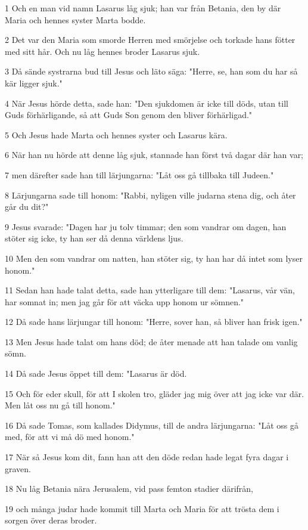 \par 1 Och en man vid namn Lasarus låg sjuk; han var från Betania, den by där Maria och hennes syster Marta bodde.
\par 2 Det var den Maria som smorde Herren med smörjelse och torkade hans fötter med sitt hår. Och nu låg hennes broder Lasarus sjuk.
\par 3 Då sände systrarna bud till Jesus och läto säga: "Herre, se, han som du har så kär ligger sjuk."
\par 4 När Jesus hörde detta, sade han: "Den sjukdomen är icke till döds, utan till Guds förhärligande, så att Guds Son genom den bliver förhärligad."
\par 5 Och Jesus hade Marta och hennes syster och Lasarus kära.
\par 6 När han nu hörde att denne låg sjuk, stannade han först två dagar där han var;
\par 7 men därefter sade han till lärjungarna: "Låt oss gå tillbaka till Judeen."
\par 8 Lärjungarna sade till honom: "Rabbi, nyligen ville judarna stena dig, och åter går du dit?"
\par 9 Jesus svarade: "Dagen har ju tolv timmar; den som vandrar om dagen, han stöter sig icke, ty han ser då denna världens ljus.
\par 10 Men den som vandrar om natten, han stöter sig, ty han har då intet som lyser honom."
\par 11 Sedan han hade talat detta, sade han ytterligare till dem: "Lasarus, vår vän, har somnat in; men jag går för att väcka upp honom ur sömnen."
\par 12 Då sade hans lärjungar till honom: "Herre, sover han, så bliver han frisk igen."
\par 13 Men Jesus hade talat om hans död; de åter menade att han talade om vanlig sömn.
\par 14 Då sade Jesus öppet till dem: "Lasarus är död.
\par 15 Och för eder skull, för att I skolen tro, gläder jag mig över att jag icke var där. Men låt oss nu gå till honom."
\par 16 Då sade Tomas, som kallades Didymus, till de andra lärjungarna: "Låt oss gå med, för att vi må dö med honom."
\par 17 När så Jesus kom dit, fann han att den döde redan hade legat fyra dagar i graven.
\par 18 Nu låg Betania nära Jerusalem, vid pass femton stadier därifrån,
\par 19 och många judar hade kommit till Marta och Maria för att trösta dem i sorgen över deras broder.
